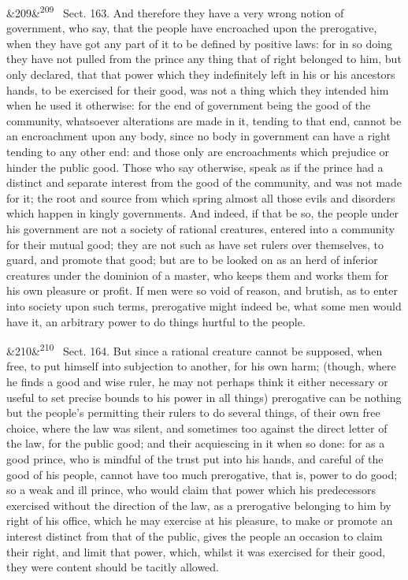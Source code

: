 \documentclass[12pt]{article}
\newcommand{\para}[1][]{\par\noindent\ifx&#1&\else\textsuperscript{\footnotesize #1}~\fi}
\begin{document}
\para[209] Sect. 163. And therefore they have a very wrong notion of government, who say, that the people have encroached upon the prerogative, when they have got any part of it to be defined by positive laws: for in so doing they have not pulled from the prince any thing that of right belonged to him, but only declared, that that power which they indefinitely left in his or his ancestors hands, to be exercised for their good, was not a thing which they intended him when he used it otherwise: for the end of government being the good of the community, whatsoever alterations are made in it, tending to that end, cannot be an encroachment upon any body, since no body in government can have a right tending to any other end: and those only are encroachments which prejudice or hinder the public good. Those who say otherwise, speak as if the prince had a distinct and separate interest from the good of the community, and was not made for it; the root and source from which spring almost all those evils and disorders which happen in kingly governments. And indeed, if that be so, the people under his government are not a society of rational creatures, entered into a community for their mutual good; they are not such as have set rulers over themselves, to guard, and promote that good; but are to be looked on as an herd of inferior creatures under the dominion of a master, who keeps them and works them for his own pleasure or profit. If men were so void of reason, and brutish, as to enter into society upon such terms, prerogative might indeed be, what some men would have it, an arbitrary power to do things hurtful to the people.

\para[210] Sect. 164. But since a rational creature cannot be supposed, when free, to put himself into subjection to another, for his own harm; (though, where he finds a good and wise ruler, he may not perhaps think it either necessary or useful to set precise bounds to his power in all things) prerogative can be nothing but the people's permitting their rulers to do several things, of their own free choice, where the law was silent, and sometimes too against the direct letter of the law, for the public good; and their acquiescing in it when so done: for as a good prince, who is mindful of the trust put into his hands, and careful of the good of his people, cannot have too much prerogative, that is, power to do good; so a weak and ill prince, who would claim that power which his predecessors exercised without the direction of the law, as a prerogative belonging to him by right of his office, which he may exercise at his pleasure, to make or promote an interest distinct from that of the public, gives the people an occasion to claim their right, and limit that power, which, whilst it was exercised for their good, they were content should be tacitly allowed.
\end{document}
